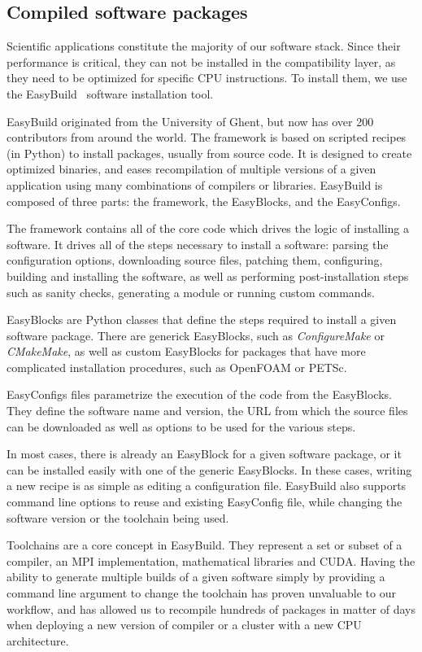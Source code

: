 \documentclass[sigconf]{acmart}
\begin{document}
\subsection{Compiled software packages}
\label{sub:Compiled_software_packages}
Scientific applications constitute the majority of our software stack. Since their performance is critical, they can not be installed in the compatibility layer, as they need to be optimized for specific CPU instructions. To install them, we use the EasyBuild~\cite{EasyBuild2012,EasyBuild2014,EasyBuild2016} software installation tool.

EasyBuild originated from the University of Ghent, but now has over 200 contributors from around the world. The framework is based on scripted recipes (in Python) to install packages, usually from source code. It is designed to create optimized binaries, and eases recompilation of multiple versions of a given application using many combinations of compilers or libraries. EasyBuild is composed of three parts: the framework, the EasyBlocks, and the EasyConfigs. 

The framework contains all of the core code which drives the logic of installing a software. It drives all of the steps necessary to install a software: parsing the configuration options, downloading source files, patching them, configuring, building and installing the software, as well as performing post-installation steps such as sanity checks, generating a module or running custom commands. 

EasyBlocks are Python classes that define the steps required to install a given software package. There are generick EasyBlocks, such as {\it ConfigureMake} or {\it CMakeMake}, as well as custom EasyBlocks for packages that have more complicated installation procedures, such as OpenFOAM or PETSc. 

EasyConfigs files parametrize the execution of the code from the EasyBlocks. They define the software name and version, the URL from which the source files can be downloaded as well as options to be used for the various steps. 

In most cases, there is already an EasyBlock for a given software package, or it can be installed easily with one of the generic EasyBlocks. In these cases, writing a new recipe is as simple as editing a configuration file. EasyBuild also supports command line options to reuse and existing EasyConfig file, while changing the software version or the toolchain being used. 

Toolchains are a core concept in EasyBuild. They represent a set or subset of a compiler, an MPI implementation, mathematical libraries and CUDA. Having the ability to generate multiple builds of a given software simply by providing a command line argument to change the toolchain has proven unvaluable to our workflow, and has allowed us to recompile hundreds of packages in matter of days when deploying a new version of compiler or a cluster with a new CPU architecture. 
\end{document}
